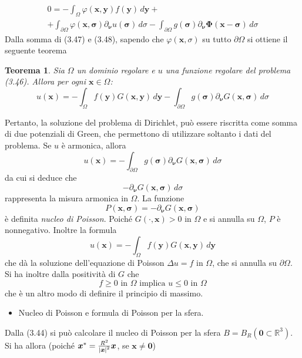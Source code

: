 \documentclass[a4paper,12pt, draft]{article}
\theoremstyle{break}
\newtheorem{theorem}{Teorema}[section]
\let\phi\varphi
\numberwithin{equation}{section}
\begin{document}
\begin{equation}
  \begin{array}{c}
    0 = - \int_{\Omega} \phi(\bm{x, y})f(\bm{y}) \, d\bm{y} + \\
    + \int_{\partial\Omega} \phi(\bm{x, \sigma})\partial_{\bm{\nu}}u(\bm{\sigma}) \, d\sigma - \int_{\partial\Omega} g(\bm{\sigma}) \partial_{\bm{\nu}} \bm{\Phi}(\bm{x} -\bm{\sigma}) \, d\sigma
  \end{array}
\end{equation}
Dalla somma di (3.47) e (3.48), sapendo che \(\phi(\bm{x}, \sigma)\) su tutto \(\partial\Omega\) si ottiene il seguente teorema
\begin{theorem}
  Sia \(\Omega\) un dominio regolare e \(u\) una funzione regolare del problema (3.46). Allora per ogni \(\bm{x} \in \Omega\):
  \begin{equation}
    u(\bm{x}) = -\int_{\Omega} f(\bm{y}) G(\bm{x,y}) \, d\bm{y} - \int_{\partial\Omega} g(\bm{\sigma}) \partial_{\bm{\nu}} G(\bm{x, \sigma}) \, d\sigma
  \end{equation}
\end{theorem}
Pertanto, la soluzione del problema di Dirichlet, può essere riscritta come somma di due potenziali di Green, che permettono di utilizzare soltanto i dati del problema. Se \(u\) è armonica, allora
\begin{equation}
  u(\bm{x}) = -\int_{\partial\Omega} g(\bm{\sigma}) \partial_{\bm{\nu}} G(\bm{x, \sigma}) \, d\sigma
\end{equation}
da cui si deduce che
\[
  -\partial_{\bm{\nu}} G(\bm{x, \sigma}) \, d\sigma
\] 
rappresenta la misura armonica in \(\Omega\). 
La funzione 
\[
  P(\bm{x, \sigma}) = -\partial_{\bm{\nu}} G(\bm{x, \sigma})
\]
è definita \emph{nucleo di Poisson}. Poiché \(G(\bm{\cdot, x}) > 0\) in \(\Omega\) e si annulla su \(\Omega\), \(P\) è nonnegativo. Inoltre la formula 
\[
  u(\bm{x}) = -\int_{\Omega} f(\bm{y}) G(\bm{x,y}) \, d\bm{y}
\]
che dà la soluzione dell'equazione di Poisson \(\Delta u = f\) in \(\Omega\), che si annulla su \(\partial\Omega\). Si ha inoltre dalla positività di \(G\) che 
\[
 f \geq 0 \mbox{ in }\Omega \mbox{ implica }u \leq 0 \mbox{ in } \Omega 
\]
che è un altro modo di definire il principio di massimo.
\begin{itemize}
  \item Nucleo di Poisson e formula di Poisson per la sfera.
\end{itemize}
Dalla (3.44) si può calcolare il nucleo di Poisson per la sfera \(B = B_R(\bm{0} \subset \mathbb{R}^3)\). Si ha allora (poiché \(\bm{x}^* = \frac{R^2}{\abs*{\bm{x}}^2}\bm{x}\), se \(\bm{x} \not = \bm{0}\))
\end{document}
